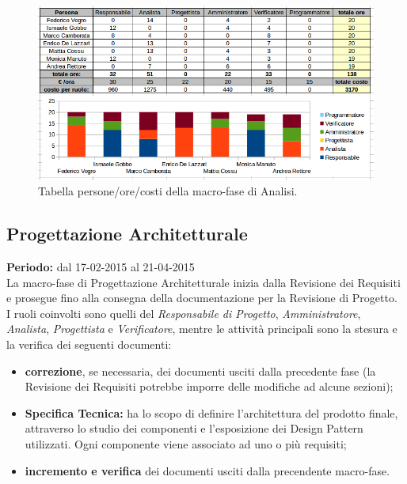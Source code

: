 \begin{figure}[h]
\begin{center}
\includegraphics[scale=0.50]{img/analisi-personeorecosti.png}
\caption{Tabella persone/ore/costi della macro-fase di Analisi.}
\end{center}
\end{figure}

\newpage
\subsection{Progettazione Architetturale}
\textbf{Periodo:} dal 17-02-2015 al 21-04-2015 \\
La macro-fase di Progettazione Architetturale inizia dalla Revisione dei Requisiti e prosegue fino alla consegna della documentazione per la Revisione di Progetto. \\
I ruoli coinvolti sono quelli del \textit{Responsabile di Progetto}, \textit{Amministratore}, \textit{Analista}, \textit{Progettista} e \textit{Verificatore}, mentre le attività principali sono la stesura e la verifica dei seguenti documenti:

\begin{itemize}
\item \textbf{correzione}, se necessaria, dei documenti usciti dalla precedente fase (la Revisione dei Requisiti potrebbe imporre delle modifiche ad alcune sezioni);
\item \textbf{Specifica Tecnica:} ha lo scopo di definire l'architettura del prodotto finale,  attraverso lo studio dei componenti e l'esposizione dei Design Pattern utilizzati. Ogni componente viene associato ad uno o più requisiti;
\item \textbf{incremento e verifica} dei documenti usciti dalla precendente macro-fase.
\end{itemize}

